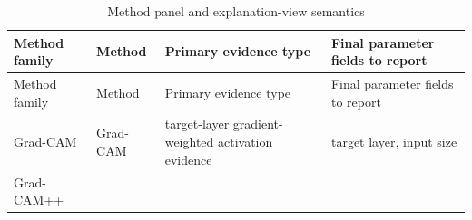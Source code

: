 \begin{longtable}[]{@{}llll@{}}
	\caption{Method panel and explanation-view semantics}\tabularnewline
	\toprule
	\begin{minipage}[b]{0.17\columnwidth}\raggedright
		Method family\strut
	\end{minipage} & \begin{minipage}[b]{0.17\columnwidth}\raggedright
		Method\strut
	\end{minipage} & \begin{minipage}[b]{0.17\columnwidth}\raggedright
		Primary evidence type\strut
	\end{minipage} & \begin{minipage}[b]{0.17\columnwidth}\raggedright
		Final parameter fields to report\strut
	\end{minipage}\tabularnewline
	\midrule
	\endfirsthead
	\toprule
	\begin{minipage}[b]{0.17\columnwidth}\raggedright
		Method family\strut
	\end{minipage} & \begin{minipage}[b]{0.17\columnwidth}\raggedright
		Method\strut
	\end{minipage} & \begin{minipage}[b]{0.17\columnwidth}\raggedright
		Primary evidence type\strut
	\end{minipage} & \begin{minipage}[b]{0.17\columnwidth}\raggedright
		Final parameter fields to report\strut
	\end{minipage}\tabularnewline
	\midrule
	\endhead
	\begin{minipage}[t]{0.17\columnwidth}\raggedright
		Grad-CAM\strut
	\end{minipage} & \begin{minipage}[t]{0.17\columnwidth}\raggedright
		Grad-CAM\strut
	\end{minipage} & \begin{minipage}[t]{0.17\columnwidth}\raggedright
		target-layer gradient-weighted activation evidence\strut
	\end{minipage} & \begin{minipage}[t]{0.17\columnwidth}\raggedright
		target layer, input size\strut
	\end{minipage}\tabularnewline
	\begin{minipage}[t]{0.17\columnwidth}\raggedright
		Grad-CAM++\strut
	\end{minipage} & \begin{minipage}[t]{0.17\columnwidth}\raggedright

\end{minipage}
\end{longtable}
